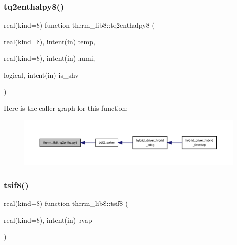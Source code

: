 \subsubsection{\texorpdfstring{tq2enthalpy8()}{tq2enthalpy8()}}
{\footnotesize\ttfamily real(kind=8) function therm\+\_\+lib8\+::tq2enthalpy8 (\begin{DoxyParamCaption}\item[{real(kind=8), intent(in)}]{temp,  }\item[{real(kind=8), intent(in)}]{humi,  }\item[{logical, intent(in)}]{is\+\_\+shv }\end{DoxyParamCaption})}

Here is the caller graph for this function\+:
\nopagebreak
\begin{figure}[H]
\begin{center}
\leavevmode
\includegraphics[width=350pt]{namespacetherm__lib8_abc11d3a9518a513fd0b3b97e6fc0e68e_icgraph}
\end{center}
\end{figure}
\mbox{\label{namespacetherm__lib8_a80b5a2ebc2ce135a214004173c06cb4e}} 
\subsubsection{\texorpdfstring{tsif8()}{tsif8()}}
{\footnotesize\ttfamily real(kind=8) function therm\+\_\+lib8\+::tsif8 (\begin{DoxyParamCaption}\item[{real(kind=8), intent(in)}]{pvap }\end{DoxyParamCaption})}

